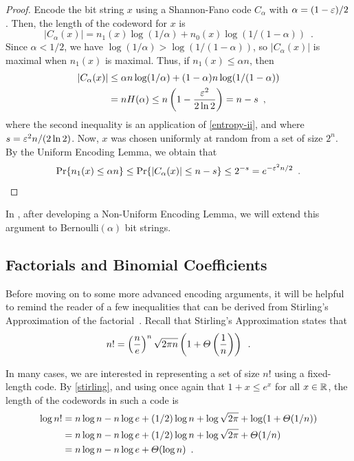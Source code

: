 \documentclass[prodmode,acmcsur]{acmsmall}
\begin{document}
\begin{proof}
  Encode the bit string $x$ using a Shannon-Fano code $C_\alpha$ with
  $\alpha=(1-\varepsilon)/2$. 
  Then, the length of the codeword for $x$ is
  \[
    |C_\alpha(x)| = n_1(x)\log(1/\alpha) + n_0(x)\log (1/(1-\alpha))
    \enspace .
  \]
  Since $\alpha < 1/2$, we have $\log(1/\alpha) > \log(1/(1-\alpha))$, so
  $|C_\alpha(x)|$ is maximal when $n_1(x)$ is maximal. 
    Thus, if $n_1(x) \le \alpha n$,
  then
  \begin{align*}
    |C_\alpha(x)| & \le \alpha n\log(1/\alpha) + (1-\alpha)n\log(1/(1-\alpha))\\
                  & = n H(\alpha) \le n\left(1-\frac{\varepsilon^2}{2\ln 2}\right) = n - s \enspace ,
  \end{align*}
  where the second inequality is an application of \eqref{entropy-ii},
  and where $s = \varepsilon^2 n/(2 \ln 2)$.  Now, $x$ was chosen uniformly at
  random from a set of size $2^n$. By the Uniform Encoding Lemma, we
  obtain that
  \[
    \Pr\{n_1(x) \leq \alpha n\} \le \Pr\{|C_\alpha(x)| \le n - s\} \le 2^{-s} = e^{-\eps^2n/2} \enspace . %
  \]
\end{proof}
In , after developing a Non-Uniform Encoding Lemma,
we will extend this argument to $\mathrm{Bernoulli}(\alpha)$ bit
strings. 

\subsection{Factorials and Binomial Coefficients}

Before moving on to some more advanced encoding arguments, it will be
helpful to remind the reader of a few inequalities that can be derived
from Stirling's Approximation of the factorial~\cite{robbins:stirling}.  
Recall that Stirling's
Approximation states that
\begin{equation}
  n! = \left(\frac{n}{e}\right)^n\sqrt{2\pi n}\left(1+\varTheta\left(\frac{1}{n}\right)\right) \enspace .
  \eqlabel{stirling}
\end{equation}

In many cases, we are interested in representing a set of size $n!$
using a fixed-length code.  By \eqref{stirling}, and using once again that
$1+x \leq e^x$ for all $x \in \mathbb{R}$, the length of the codewords in such a code
is
\begin{align}
  \log n!
  & = n\log n - n\log e + (1/2)\log n + \log \sqrt{2 \pi} + \log(1+\varTheta(1/n)) \notag \\
  & = n\log n - n\log e + (1/2)\log n + \log \sqrt{2 \pi} + \varTheta(1/n) \notag \\
  & = n\log n - n\log e + \varTheta(\log n) \eqlabel{stirling-loose}
    \enspace .
\end{align}
\end{document}
